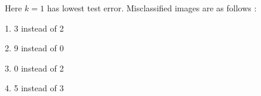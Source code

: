 \documentclass[twoside,10pt,a4paper]{article}
\theoremstyle{definition}
\theoremstyle{definition}
\theoremstyle{remark}
\renewcommand{\>}{{\rightarrow}}
\newcommand{\1}{{\mathbf 1}}
\newcommand{\0}{{\mathbf 0}}
\begin{document}
Here $ k = 1 $ has lowest test error.
Misclassified images are as follows :

1. 3 instead of 2

\begin{center}
\end{center}

2. 9 instead of 0

\begin{center}
\end{center}

\vspace{120pt}
3. 0 instead of 2

\begin{center}
\end{center}

4. 5 instead of 3

\begin{center}
\end{center}
\end{document}

